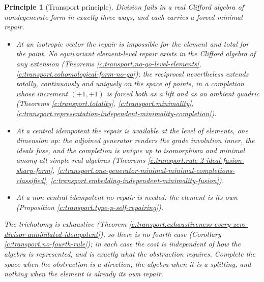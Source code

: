 \documentclass[11pt]{article}
\newtheorem{principle}[theorem]{Principle}
\theoremstyle{definition}
\theoremstyle{plain}
\begin{document}
\begin{principle}[Transport principle]\label{c:transport.transport-principle}
Division fails in a real Clifford algebra of nondegenerate form in exactly three ways, and each carries a forced minimal repair.
\begin{itemize}
\item \emph{At an isotropic vector} the repair is impossible for the element and total for the point. No equivariant element-level repair exists in the Clifford algebra of any extension (Theorems \ref{c:transport.no-go-level-elements}, \ref{c:transport.cohomological-form-no-go}); the reciprocal nevertheless extends totally, continuously and uniquely on the space of points, in a completion whose increment $(+1,+1)$ is forced both as a lift and as an ambient quadric (Theorems \ref{c:transport.totality}, \ref{c:transport.minimality}, \ref{c:transport.representation-independent-minimality-completion}).
\item \emph{At a central idempotent} the repair is available at the level of elements, one dimension up: the adjoined generator renders the grade involution inner, the ideals fuse, and the completion is unique up to isomorphism and minimal among all simple real algebras (Theorems \ref{c:transport.rule-2-ideal-fusion-sharp-form}, \ref{c:transport.one-generator-minimal-minimal-completions-classified}, \ref{c:transport.embedding-independent-minimality-fusion}).
\item \emph{At a non-central idempotent} no repair is needed: the element is its own (Proposition \ref{c:transport.type-p-self-repairing}).
\end{itemize}
The trichotomy is exhaustive (Theorem \ref{c:transport.exhaustiveness-every-zero-divisor-annihilated-idempotent}), so there is no fourth case (Corollary \ref{c:transport.no-fourth-rule}); in each case the cost is independent of how the algebra is represented, and is exactly what the obstruction requires. \emph{Complete the space when the obstruction is a direction, the algebra when it is a splitting, and nothing when the element is already its own repair.}
\end{principle}
\end{document}
